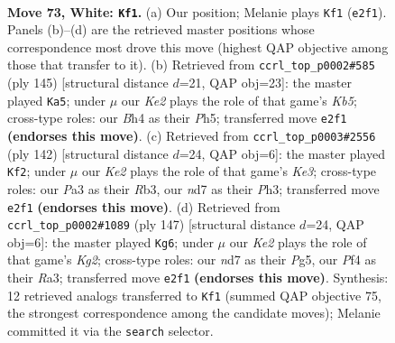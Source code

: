 \documentclass[11pt]{article}
\begin{document}
\clearpage

\begin{figure}[p]\centering
\begin{subfigure}{0.46\textwidth}\centering
\resizebox{\linewidth}{!}{%
\newchessgame
\chessboard[
  setfen={7k/3nR3/8/3r4/p4P1B/P6P/4K3/8 w - - 1 73},
  showmover=false,
  pgfstyle=straightmove, color=movearrow, markmove={e2-f1}
]}
\caption{}
\end{subfigure}\hfill
\begin{subfigure}{0.46\textwidth}\centering
\resizebox{\linewidth}{!}{%
\newchessgame
\chessboard[
  setfen={8/7p/8/4K2p/1k4rN/7R/8/8 b - - 10 73},
  showmover=false,
  pgfstyle=straightmove, color=movearrow, markmove={b4-a5}
]}
\caption{}
\end{subfigure}
\\[4pt]
\begin{subfigure}{0.46\textwidth}\centering
\resizebox{\linewidth}{!}{%
\newchessgame
\chessboard[
  setfen={8/6k1/1n4p1/1P6/7r/1R2K2P/2B5/8 w - - 25 72},
  showmover=false,
  pgfstyle=straightmove, color=movearrow, markmove={e3-f2}
]}
\caption{}
\end{subfigure}\hfill
\begin{subfigure}{0.46\textwidth}\centering
\resizebox{\linewidth}{!}{%
\newchessgame
\chessboard[
  setfen={8/6k1/8/5ppR/3P4/r7/5K1N/8 b - - 10 74},
  showmover=false,
  pgfstyle=straightmove, color=movearrow, markmove={g7-g6}
]}
\caption{}
\end{subfigure}
\caption{\textbf{Move 73, White: \texttt{Kf1}.} (a) Our position; Melanie plays \texttt{Kf1} (\texttt{e2f1}). Panels (b)--(d) are the retrieved master positions whose correspondence most drove this move (highest QAP objective among those that transfer to it). (b) Retrieved from \texttt{ccrl\_top\_p0002\#585} (ply 145) [structural distance $d$=21, QAP obj=23]: the master played \texttt{Ka5}; under $\mu$ our \emph{Ke2} plays the role of that game's \emph{Kb5}; cross-type roles: our \emph{B}h4 as their \emph{P}h5; transferred move \texttt{e2f1} \textbf{(endorses this move)}. (c) Retrieved from \texttt{ccrl\_top\_p0003\#2556} (ply 142) [structural distance $d$=24, QAP obj=6]: the master played \texttt{Kf2}; under $\mu$ our \emph{Ke2} plays the role of that game's \emph{Ke3}; cross-type roles: our \emph{P}a3 as their \emph{R}b3, our \emph{n}d7 as their \emph{P}h3; transferred move \texttt{e2f1} \textbf{(endorses this move)}. (d) Retrieved from \texttt{ccrl\_top\_p0002\#1089} (ply 147) [structural distance $d$=24, QAP obj=6]: the master played \texttt{Kg6}; under $\mu$ our \emph{Ke2} plays the role of that game's \emph{Kg2}; cross-type roles: our \emph{n}d7 as their \emph{P}g5, our \emph{P}f4 as their \emph{R}a3; transferred move \texttt{e2f1} \textbf{(endorses this move)}. Synthesis: 12 retrieved analogs transferred to \texttt{Kf1} (summed QAP objective 75, the strongest correspondence among the candidate moves); Melanie committed it via the \texttt{search} selector.}
\label{fig:thought-m144}
\end{figure}
\end{document}
